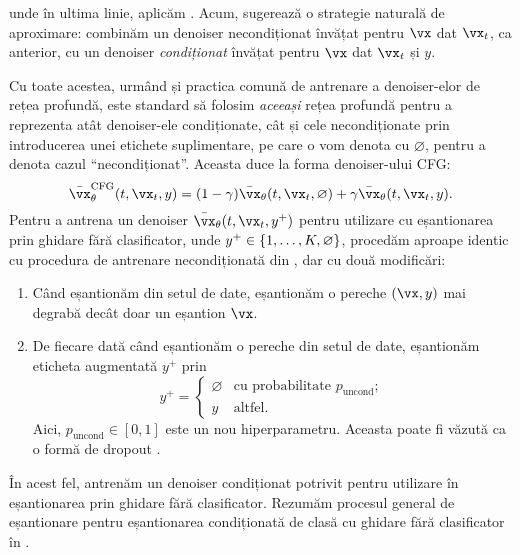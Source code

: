 \documentclass[../../book-main_ro.tex]{subfiles}
\begin{document}
unde în ultima linie, aplicăm
.
Acum,  sugerează o strategie naturală de aproximare: combinăm
un denoiser necondiționat învățat pentru $\vx$ dat $\vx_t$, ca anterior,
cu un denoiser \textit{condiționat} învățat pentru $\vx$ dat $\vx_t$ și $y$.


Cu toate acestea, urmând \textcite{Ho2022-ry} și practica comună de antrenare a
denoiser-elor de rețea profundă, este standard să folosim \textit{aceeași} rețea profundă pentru a reprezenta
atât denoiser-ele condiționate, cât și cele necondiționate prin introducerea unei etichete
suplimentare, pe care o vom denota cu $\varnothing$, pentru a denota cazul ``necondiționat''.
Aceasta duce la forma denoiser-ului CFG:
\begin{equation}\label{eq:conditional-denoising-mmse-denoiser-paired-data-approx-cfg}
  \bar{\vx}_{\theta}^{\mathrm{CFG}}(t, \vx_t, y)
  =
  (1 - \gamma) \bar{\vx}_{\theta}(t, \vx_t, \varnothing)
  +
  \gamma \bar{\vx}_{\theta}(t, \vx_t, y).
\end{equation}
Pentru a antrena un denoiser $\bar{\vx}_{\theta}(t, \vx_t, y^+)$ pentru utilizare cu
eșantionarea prin ghidare fără clasificator, unde $y^+ \in
\set{1, \dots, K, \varnothing}$, procedăm aproape identic cu procedura de
antrenare necondiționată din , dar cu două
modificări:
\begin{enumerate}
  \item Când eșantionăm din setul de date, eșantionăm o pereche $(\vx, y)$ mai degrabă decât
    doar un eșantion $\vx$.
  \item De fiecare dată când eșantionăm o pereche din setul de date, eșantionăm eticheta
    augmentată $y^+$ prin
    \begin{equation}
      y^+ = \begin{cases}
        \varnothing & \text{cu probabilitate } p_{\mathrm{uncond}}; \\
        y & \text{altfel}.
      \end{cases}
    \end{equation}
    Aici, $p_{\mathrm{uncond}} \in [0, 1]$ este un nou hiperparametru.
    Aceasta poate fi văzută ca o formă de dropout \cite{srivastava2014dropout}.
\end{enumerate}
În acest fel, antrenăm un denoiser condiționat potrivit pentru utilizare în eșantionarea
prin ghidare fără clasificator. Rezumăm procesul general de eșantionare pentru
eșantionarea condiționată de clasă cu ghidare fără clasificator în
.
\end{document}

